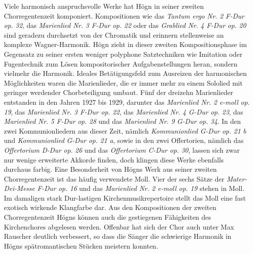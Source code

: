 Viele harmonisch anspruchsvolle Werke hat Högn in seiner zweiten
Chorregentenzeit komponiert. Kompositionen wie das \textit{Tantum
ergo Nr. 2 F-Dur} \textit{op. 32}, das \textit{Marienlied Nr. 3 F-Dur
op. 22} oder das \textit{Grablied Nr. 4 F-Dur op. 20} sind geradezu
durchsetzt von der Chromatik und erinnern stellenweise an komplexe
Wagner-Harmonik. Högn zieht in dieser zweiten Kompositionsphase im
Gegensatz zu seiner ersten weniger polyphone Satztechniken wie
Imitation oder Fugentechnik zum Lösen kompositorischer
Aufgabenstellungen heran, sondern vielmehr die Harmonik. Ideales
Betätigungsfeld zum Ausreizen der harmonischen Möglichkeiten waren die
Marienlieder, die er immer mehr zu einem Sololied mit geringer
werdender Chorbeteiligung umbaut. Fünf der dreizehn Marienlieder
entstanden in den Jahren 1927 bis 1929, darunter das \textit{Marienlied
Nr. 2 e-moll op. 19}, das \textit{Marienlied Nr. 3 F-Dur op. 22}, das
\textit{Marienlied Nr. 4 G-Dur op. 23}, das \textit{Marienlied Nr. 5
F-Dur op. 28} und das \textit{Marienlied Nr. 9 G-Dur op. 34}. In den
zwei Kommunionliedern aus dieser Zeit, nämlich
\textit{Kommu}\textit{nionlied G-Dur op. 21 b} und
\textit{Kommunionlied G-Dur op. 21 a}, sowie in den zwei Offertorien,
nämlich das \textit{Offertorium D-Dur op. 26} und das
\textit{Offertorium C-Dur op. 30}, lassen sich zwar nur wenige
erweiterte Akkorde finden, doch klingen diese Werke ebenfalls durchaus
farbig. Eine Besonderheit von Högns Werk aus seiner zweiten
Chorregentenzeit ist das häufig verwendete Moll. Vier der sechs Sätze
der \textit{Mater-Dei-Messe F-Dur op. 16} und das \textit{Marienlied
Nr. 2 e-moll op. 19} stehen in Moll. Im damaligen stark Dur-lastigen
Kirchenmusikrepertoire stellt das Moll eine fast exotisch wirkende
Klangfarbe dar. Aus den Kompositionen der zweiten Chorregentenzeit
Högns können auch die gestiegenen Fähigkeiten des Kirchenchores
abgelesen werden. Offenbar hat sich der Chor auch unter Max Rauscher
deutlich verbessert, so dass die Sänger die schwierige Harmonik in
Högns spätromantischen Stücken meistern konnten.